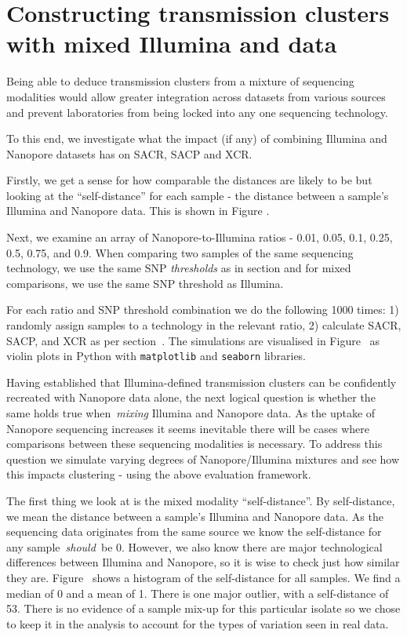 \section{Constructing transmission clusters with mixed Illumina and \ont{} data}

Being able to deduce transmission clusters from a mixture of sequencing
modalities would allow greater integration across datasets from various
sources and prevent laboratories from being locked into any one
sequencing technology.

To this end, we investigate what the impact (if any) of combining
Illumina and Nanopore datasets has on SACR, SACP and XCR.

Firstly, we get a sense for how comparable the distances are likely to
be but looking at the ``self-distance'' for each sample - the distance
between a sample's Illumina and Nanopore data. This is shown in Figure
.

Next, we examine an array of Nanopore-to-Illumina ratios - 0.01, 0.05,
0.1, 0.25, 0.5, 0.75, and 0.9. When comparing two samples of the same
sequencing technology, we use the same SNP \emph{thresholds} as in
section  and for mixed comparisons, we
use the same SNP threshold as Illumina.

For each ratio and SNP threshold combination we do the following 1000
times: 1) randomly assign samples to a technology in the relevant ratio,
2) calculate SACR, SACP, and XCR as per
section~. The simulations are visualised
in Figure~ as violin plots in Python with
\texttt{matplotlib} and \texttt{seaborn} libraries.

Having established that Illumina-defined transmission clusters can be
confidently recreated with Nanopore data alone, the next logical
question is whether the same holds true when~\emph{mixing} Illumina and
Nanopore data. As the uptake of Nanopore sequencing increases it seems
inevitable there will be cases where comparisons between these
sequencing modalities is necessary. To address this question we simulate
varying degrees of Nanopore/Illumina mixtures and see how this impacts
clustering - using the above evaluation framework.

The first thing we look at is the mixed modality ``self-distance''. By
self-distance, we mean the distance between a sample's Illumina and
Nanopore data. As the sequencing data originates from the same source we
know the self-distance for any sample~\emph{should~}be 0. However, we
also know there are major technological differences between Illumina and
Nanopore, so it is wise to check just how similar they are.
Figure~ shows a histogram of the
self-distance for all samples. We find a median of 0 and a mean of 1.
There is one major outlier, with a self-distance of 53. There is no
evidence of a sample mix-up for this particular isolate so we chose to
keep it in the analysis to account for the types of variation seen in
real data.

